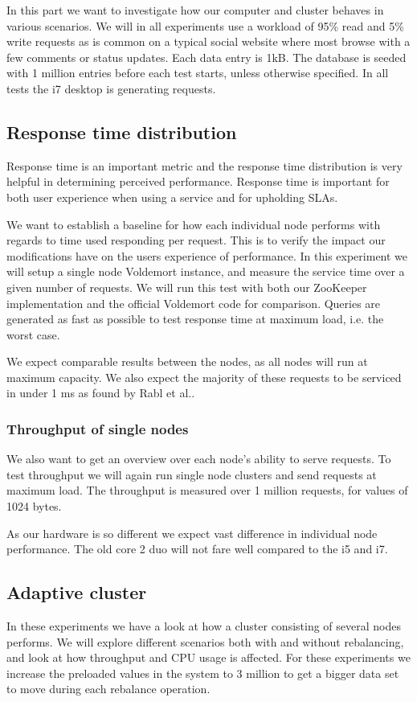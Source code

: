 In this part we want to investigate how our computer and cluster behaves in various scenarios. We will in all experiments use a workload of 95\% read and 5\% write requests as is common on a typical social website where most browse with a few comments or status updates. Each data entry is 1kB. The database is seeded with 1 million entries before each test starts, unless otherwise specified. In all tests the i7 desktop is generating requests. 

\subsection{Response time distribution}
Response time is an important metric and the response time distribution is very helpful in determining perceived performance. Response time is important for both user experience when using a service and for upholding SLAs.

We want to establish a baseline for how each individual node performs with regards to time used responding per request. This is to verify the impact our modifications have on the users experience of performance. In this experiment we will setup a single node Voldemort instance, and measure the service time over a given number of requests. We will run this test with both our ZooKeeper implementation and the official Voldemort code for comparison. 
Queries are generated as fast as possible to test response time at maximum load, i.e. the worst case.

We expect comparable results between the nodes, as all nodes will run at maximum capacity. We also expect the majority of these requests to be serviced in under 1 ms as found by Rabl et al.\cite{Rabl:2012:SBD:2367502.2367512}.

\subsubsection{Throughput of single nodes}
We also want to get an overview over each node's ability to serve requests. To test throughput we will again run single node clusters and send requests at maximum load. The throughput is measured over 1 million requests, for values of 1024 bytes. 

As our hardware is so different we expect vast difference in individual node performance. The old core 2 duo will not fare well compared to the i5 and i7. 

\subsection{Adaptive cluster}
In these experiments we have a look at how a cluster consisting of several nodes performs. We will explore different scenarios both with and without rebalancing, and look at how throughput and CPU usage is affected. For these experiments we increase the preloaded values in the system to 3 million to get a bigger data set to move during each rebalance operation. 

